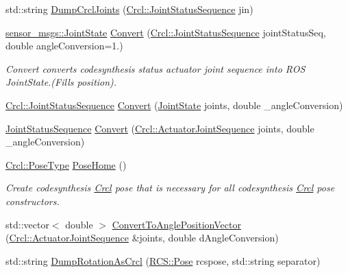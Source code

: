 \begin{DoxyCompactItemize}
std\-::string \hyperlink{namespaceCrcl_ac02e068ed5b8f6f152cff928e554a653}{Dump\-Crcl\-Joints} (\hyperlink{namespaceCrcl_a8e2d423195eeffb85b45b63f595f2825}{Crcl\-::\-Joint\-Status\-Sequence} jin)
\item 
\hyperlink{RCS_8h_aa4adb93a26caa4dacba9c9614e283245}{sensor\-\_\-msgs\-::\-Joint\-State} \hyperlink{namespaceCrcl_a84440a94ca5992cf4a01e4215d1cb363}{Convert} (\hyperlink{namespaceCrcl_a8e2d423195eeffb85b45b63f595f2825}{Crcl\-::\-Joint\-Status\-Sequence} joint\-Status\-Seq, double angle\-Conversion=1.)
\begin{DoxyCompactList}\small\item\em Convert converts codesynthesis status actuator joint sequence into R\-O\-S Joint\-State.(Fills position). \end{DoxyCompactList}\item 
\hyperlink{namespaceCrcl_a8e2d423195eeffb85b45b63f595f2825}{Crcl\-::\-Joint\-Status\-Sequence} \hyperlink{namespaceCrcl_a2a88d5186b3c539f968de637937294fb}{Convert} (\hyperlink{RCS_8h_aa4adb93a26caa4dacba9c9614e283245}{Joint\-State} joints, double \-\_\-angle\-Conversion)
\item 
\hyperlink{namespaceCrcl_a8e2d423195eeffb85b45b63f595f2825}{Joint\-Status\-Sequence} \hyperlink{namespaceCrcl_aa0e865c06943bf013c06bdc6fa538760}{Convert} (\hyperlink{namespaceCrcl_af084766e8e2d38a135cc67ef54d9904d}{Crcl\-::\-Actuator\-Joint\-Sequence} joints, double \-\_\-angle\-Conversion)
\item 
\hyperlink{namespaceCrcl_acc6c82b52280f4d0e74b82a92400956e}{Crcl\-::\-Pose\-Type} \hyperlink{namespaceCrcl_a5e9036e140bcf2156b7995085f36d75f}{Pose\-Home} ()
\begin{DoxyCompactList}\small\item\em Create codesynthesis \hyperlink{namespaceCrcl}{Crcl} pose that is necessary for all codesynthesis \hyperlink{namespaceCrcl}{Crcl} pose constructors. \end{DoxyCompactList}\item 
std\-::vector$<$ double $>$ \hyperlink{namespaceCrcl_a942871711b02866236621b132bf934c2}{Convert\-To\-Angle\-Position\-Vector} (\hyperlink{namespaceCrcl_af084766e8e2d38a135cc67ef54d9904d}{Crcl\-::\-Actuator\-Joint\-Sequence} \&joints, double d\-Angle\-Conversion)
\item 
std\-::string \hyperlink{namespaceCrcl_a710c3a8bdd5a36fc1df3996f005544ec}{Dump\-Rotation\-As\-Crcl} (\hyperlink{namespaceRCS_aa07e45d8a50e30064283d2b38087f999}{R\-C\-S\-::\-Pose} rcspose, std\-::string separator)
\item 

\end{DoxyCompactItemize}
